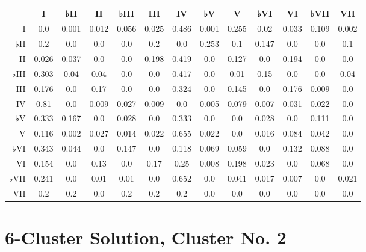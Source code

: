 \begin{table}[htbp]
\begin{minipage}{\linewidth}
\setlength{\tymax}{0.5\linewidth}
\centering
\small
\begin{tabulary}{\textwidth}{@{}RCCCCCCCCCCCC@{}} \toprule
&I&♭II&II&♭III&III&IV&♭V&V&♭VI&VI&♭VII&VII\\
\midrule
I&0.0&0.001&0.012&0.056&0.025&0.486&0.001&0.255&0.02&0.033&0.109&0.002\\
♭II&0.2&0.0&0.0&0.0&0.2&0.0&0.253&0.1&0.147&0.0&0.0&0.1\\
II&0.026&0.037&0.0&0.0&0.198&0.419&0.0&0.127&0.0&0.194&0.0&0.0\\
♭III&0.303&0.04&0.04&0.0&0.0&0.417&0.0&0.01&0.15&0.0&0.0&0.04\\
III&0.176&0.0&0.17&0.0&0.0&0.324&0.0&0.145&0.0&0.176&0.009&0.0\\
IV&0.81&0.0&0.009&0.027&0.009&0.0&0.005&0.079&0.007&0.031&0.022&0.0\\
♭V&0.333&0.167&0.0&0.028&0.0&0.333&0.0&0.0&0.028&0.0&0.111&0.0\\
V&0.116&0.002&0.027&0.014&0.022&0.655&0.022&0.0&0.016&0.084&0.042&0.0\\
♭VI&0.343&0.044&0.0&0.147&0.0&0.118&0.069&0.059&0.0&0.132&0.088&0.0\\
VI&0.154&0.0&0.13&0.0&0.17&0.25&0.008&0.198&0.023&0.0&0.068&0.0\\
♭VII&0.241&0.0&0.01&0.01&0.0&0.652&0.0&0.041&0.017&0.007&0.0&0.021\\
VII&0.2&0.2&0.0&0.2&0.2&0.2&0.0&0.0&0.0&0.0&0.0&0.0\\

\bottomrule

\end{tabulary}
\end{minipage}
\end{table}

\section{6-Cluster Solution, Cluster No. 2}
\label{6-clustersolutionclusterno.2}


